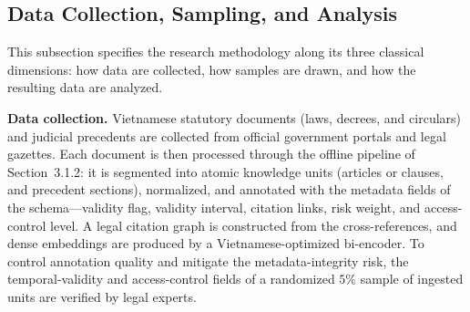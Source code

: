 \subsection{Data Collection, Sampling, and Analysis}
This subsection specifies the research methodology along its three classical dimensions: how data are collected, how samples are drawn, and how the resulting data are analyzed.

\textbf{Data collection.} Vietnamese statutory documents (laws, decrees, and circulars) and judicial precedents are collected from official government portals and legal gazettes. Each document is then processed through the offline pipeline of Section~3.1.2: it is segmented into atomic knowledge units (articles or clauses, and precedent sections), normalized, and annotated with the metadata fields of the schema---validity flag, validity interval, citation links, risk weight, and access-control level. A legal citation graph is constructed from the cross-references, and dense embeddings are produced by a Vietnamese-optimized bi-encoder. To control annotation quality and mitigate the metadata-integrity risk, the temporal-validity and access-control fields of a randomized $5\%$ sample of ingested units are verified by legal experts.

